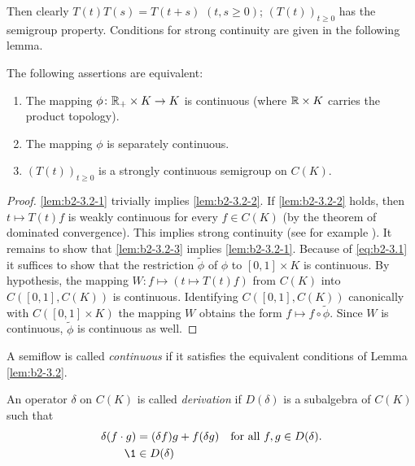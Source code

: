 Then clearly $T(t)T(s) = T(t+s)$ $(t,s\geq 0)$; \ie  $(T(t))_{t \geq 0}$ has the
semigroup property.
Conditions for strong continuity are given in the following lemma.

\begin{lemma}\label{lem:b2-3.2}
The following assertions are equivalent:
\begin{enumerate}[\upshape (a)]
\item \label{lem:b2-3.2-1}
The mapping $\phi \colon \mathbb{R}_{+} \times K \to K$ is continuous (where $\mathbb{R} \times K$ carries the product topology).
\item \label{lem:b2-3.2-2}
The mapping $\phi$ is separately continuous.
\item \label{lem:b2-3.2-3}
$(T(t))_{t \geq 0}$ is a strongly continuous semigroup on $C(K)$.
\end{enumerate}
\end{lemma}

\begin{proof}
\ref{lem:b2-3.2-1} trivially implies \ref{lem:b2-3.2-2}.
If \ref{lem:b2-3.2-2} holds, then $t \mapsto T(t)f$ is weakly continuous for every $f \in C(K)$ (by the theorem of dominated convergence).
This implies strong continuity (see for example \citet[Proposition 1.23]{davies:1980}).
It remains to show that \ref{lem:b2-3.2-3} implies \ref{lem:b2-3.2-1}.
Because of \eqref{eq:b2-3.1} it suffices to show that the restriction $\widetilde{\phi}$ of $\phi$ to $[0,1] \times K$ is continuous.
By hypothesis, the mapping $W \colon f \mapsto (t \mapsto T(t)f)$ from $C(K)$ into $C([0,1],C(K))$ is continuous.
Identifying $C([0,1],C(K))$ canonically with $C([0,1] \times K)$ the mapping $W$ obtains the form $f \mapsto f \circ \widetilde{\phi}$.
Since $W$ is continuous, $\widetilde{\phi}$ is continuous as well.
\end{proof}

A semiflow is called \emph{continuous} if it satisfies the equivalent conditions of Lemma \ref{lem:b2-3.2}.

\begin{definition}\label{def:b2-3.3}
An operator $\delta$ on $C(K)$ is called \emph{derivation} if $D(\delta)$ is a subalgebra of $C(K)$ such that
\begin{align}
\delta(f \cdot g) &= (\delta f)g + f(\delta g) \quad \text{for all } f,g \in D(\delta). \label{eq:b2-3.4} \\
\1 &\in D(\delta) \label{eq:b2-3.5}
\end{align}
\end{definition}

